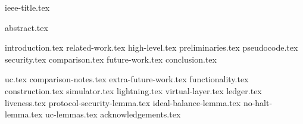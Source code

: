 \documentclass[conference]{IEEEtran}
\begin{document}
{ieee-title.tex}
\maketitle
{abstract.tex}

{introduction.tex}
{related-work.tex}
{high-level.tex}
{preliminaries.tex}
{pseudocode.tex}
{security.tex}
{comparison.tex}
{future-work.tex}
{conclusion.tex}

\newpage
\appendix
{uc.tex}
{comparison-notes.tex}
{extra-future-work.tex}
{functionality.tex}
{construction.tex}
{simulator.tex}
{lightning.tex}
{virtual-layer.tex}
{ledger.tex}
{liveness.tex}
{protocol-security-lemma.tex}
{ideal-balance-lemma.tex}
{no-halt-lemma.tex}
{uc-lemmas.tex}
{acknowledgements.tex}
\end{document}
